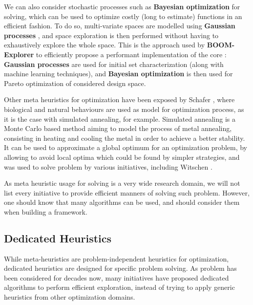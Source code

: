         We can also consider stochastic processes such as {\bf Bayesian optimization} for  solving, which can be used to optimize costly (\ie long to estimate) functions in an efficient fashion.
        To do so, multi-variate spaces are modelled using {\bf Gaussian processes} \cite{lo_model-based_2016}\cite{lo_multi-fidelity_2018}, and space exploration is then performed without having to exhaustively explore the whole space.
        This is the approach used by {\bf BOOM-Explorer} to efficiently propose a performant implementation of the  core \cite{bai_boom-explorer_2021}: {\bf Gaussian processes} are used for initial set characterization (along with machine learning techniques), and {\bf Bayesian optimization} is then used for Pareto optimization of considered design space.

        Other meta heuristics for optimization have been exposed by Schafer \etal{} \cite{schafer_high-level_2020}, where biological and natural behaviours are used as model for optimization process, as it is the case with simulated annealing, for example.
        Simulated annealing is a Monte Carlo based method aiming to model the process of metal annealing, consisting in heating and cooling the metal in order to achieve a better stability.
        It can be used to approximate a global optimum for an optimization problem, by allowing to avoid local optima which could be found by simpler strategies, and was used to solve  problem by various initiatives, including Witschen \etal{} \cite{witschen_circa_2019}.

        As meta heuristic usage for  solving is a very wide research domain, we will not list every initiative to provide efficient manners of solving such problem.
        However, one should know that many algorithms can be used, and should consider them when building a  framework.        

    \subsection{Dedicated Heuristics}
    \label{ch.state:sec.strategies:ssec.dedicated}
        While meta-heuristics are problem-independent heuristics for optimization, dedicated heuristics are designed for specific problem solving.
        As  problem has been considered for decades now, many initiatives have proposed dedicated algorithms to perform efficient exploration, instead of trying to apply generic heuristics from other optimization domains.

